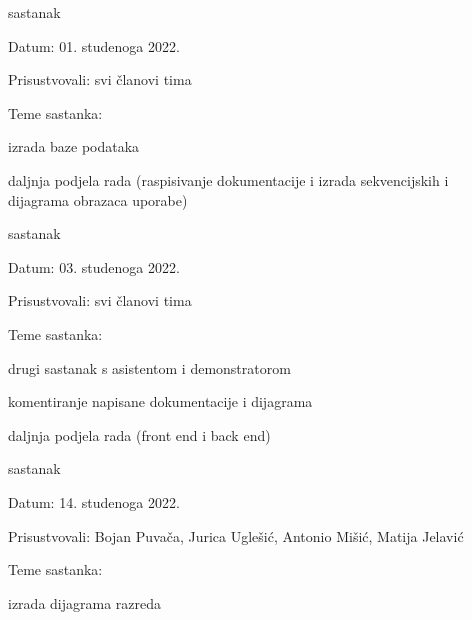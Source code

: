 \begin{packed_enum}
                \item  sastanak
			\item[] \begin{packed_item}
				\item Datum: 01. studenoga 2022.
				\item Prisustvovali: svi članovi tima
				\item Teme sastanka:
				\begin{packed_item}
					\item  izrada baze podataka
					\item  daljnja podjela rada (raspisivanje dokumentacije i izrada sekvencijskih i dijagrama obrazaca uporabe)
				\end{packed_item}
			\end{packed_item}

                \item  sastanak
			\item[] \begin{packed_item}
				\item Datum: 03. studenoga 2022.
				\item Prisustvovali: svi članovi tima
				\item Teme sastanka:
				\begin{packed_item}
					\item  drugi sastanak s asistentom i demonstratorom
					\item  komentiranje napisane dokumentacije i dijagrama
                        \item  daljnja podjela rada (front end i back end)
				\end{packed_item}
			\end{packed_item}

                \item  sastanak
			\item[] \begin{packed_item}
				\item Datum: 14. studenoga 2022.
				\item Prisustvovali: Bojan Puvača, Jurica Uglešić, Antonio Mišić, Matija Jelavić
				\item Teme sastanka:
				\begin{packed_item}
					\item  izrada dijagrama razreda
                        
				\end{packed_item}
			\end{packed_item}
			
			
		\end{packed_enum}
		
